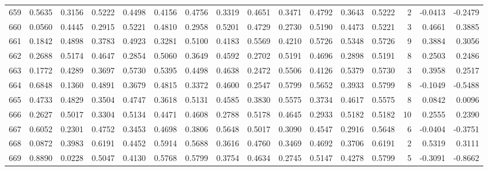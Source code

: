 \begin{tabular}{lrrrrrrrrrrrrrrr}
659 &      0.5635 &  0.3156 &  0.5222 &  0.4498 &  0.4156 &  0.4756 &  0.3319 &  0.4651 &  0.3471 &  0.4792 &   0.3643 &     0.5222 &      2 &                   -0.0413 &                    -0.2479 \\
660 &      0.0560 &  0.4445 &  0.2915 &  0.5221 &  0.4810 &  0.2958 &  0.5201 &  0.4729 &  0.2730 &  0.5190 &   0.4473 &     0.5221 &      3 &                    0.4661 &                     0.3885 \\
661 &      0.1842 &  0.4898 &  0.3783 &  0.4923 &  0.3281 &  0.5100 &  0.4183 &  0.5569 &  0.4210 &  0.5726 &   0.5348 &     0.5726 &      9 &                    0.3884 &                     0.3056 \\
662 &      0.2688 &  0.5174 &  0.4647 &  0.2854 &  0.5060 &  0.3649 &  0.4592 &  0.2702 &  0.5191 &  0.4696 &   0.2898 &     0.5191 &      8 &                    0.2503 &                     0.2486 \\
663 &      0.1772 &  0.4289 &  0.3697 &  0.5730 &  0.5395 &  0.4498 &  0.4638 &  0.2472 &  0.5506 &  0.4126 &   0.5379 &     0.5730 &      3 &                    0.3958 &                     0.2517 \\
664 &      0.6848 &  0.1360 &  0.4891 &  0.3679 &  0.4815 &  0.3372 &  0.4600 &  0.2547 &  0.5799 &  0.5652 &   0.3933 &     0.5799 &      8 &                   -0.1049 &                    -0.5488 \\
665 &      0.4733 &  0.4829 &  0.3504 &  0.4747 &  0.3618 &  0.5131 &  0.4585 &  0.3830 &  0.5575 &  0.3734 &   0.4617 &     0.5575 &      8 &                    0.0842 &                     0.0096 \\
666 &      0.2627 &  0.5017 &  0.3304 &  0.5134 &  0.4471 &  0.4608 &  0.2788 &  0.5178 &  0.4645 &  0.2933 &   0.5182 &     0.5182 &     10 &                    0.2555 &                     0.2390 \\
667 &      0.6052 &  0.2301 &  0.4752 &  0.3453 &  0.4698 &  0.3806 &  0.5648 &  0.5017 &  0.3090 &  0.4547 &   0.2916 &     0.5648 &      6 &                   -0.0404 &                    -0.3751 \\
668 &      0.0872 &  0.3983 &  0.6191 &  0.4452 &  0.5914 &  0.5688 &  0.3616 &  0.4760 &  0.3469 &  0.4692 &   0.3706 &     0.6191 &      2 &                    0.5319 &                     0.3111 \\
669 &      0.8890 &  0.0228 &  0.5047 &  0.4130 &  0.5768 &  0.5799 &  0.3754 &  0.4634 &  0.2745 &  0.5147 &   0.4278 &     0.5799 &      5 &                   -0.3091 &                    -0.8662 \\

\end{tabular}
